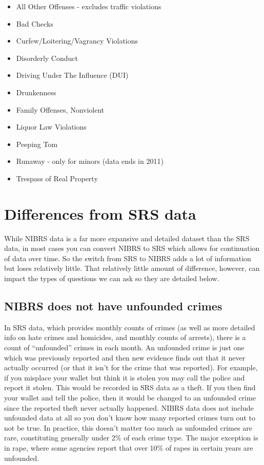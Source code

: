 \documentclass[
]{krantz}
\providecommand{\tightlist}{%
  \setlength{\itemsep}{0pt}\setlength{\parskip}{0pt}}
\begin{document}
\begin{itemize}
\tightlist
\item
  All Other Offenses - excludes traffic violations
\item
  Bad Checks\\
\item
  Curfew/Loitering/Vagrancy Violations
\item
  Disorderly Conduct\\
\item
  Driving Under The Influence (DUI)
\item
  Drunkenness\\
\item
  Family Offenses, Nonviolent
\item
  Liquor Law Violations\\
\item
  Peeping Tom
\item
  Runaway - only for minors (data ends in 2011)
\item
  Trespass of Real Property
\end{itemize}

\section{Differences from SRS
data}\label{differences-from-srs-data}

While NIBRS data is a far more expansive and detailed
dataset than the SRS data, in most cases you can convert
NIBRS to SRS which allows for continuation of data over
time. So the switch from SRS to NIBRS adds a lot of
information but loses relatively little. That relatively
little amount of difference, however, can impact the types
of questions we can ask so they are detailed below.

\subsection{NIBRS does not have unfounded
crimes}\label{nibrs-does-not-have-unfounded-crimes}

In SRS data, which provides monthly counts of crimes (as
well as more detailed info on hate crimes and homicides, and
monthly counts of arrests), there is a count of
``unfounded'' crimes in each month. An unfounded crime is
just one which was previously reported and then new evidence
finds out that it never actually occurred (or that it isn't
for the crime that was reported). For example, if you
misplace your wallet but think it is stolen you may call the
police and report it stolen. This would be recorded in SRS
data as a theft. If you then find your wallet and tell the
police, then it would be changed to an unfounded crime since
the reported theft never actually happened. NIBRS data does
not include unfounded data at all so you don't know how many
reported crimes turn out to not be true. In practice, this
doesn't matter too much as unfounded crimes are rare,
constituting generally under 2\% of each crime type. The
major exception is in rape, where some agencies report that
over 10\% of rapes in certain years are unfounded.
\end{document}
